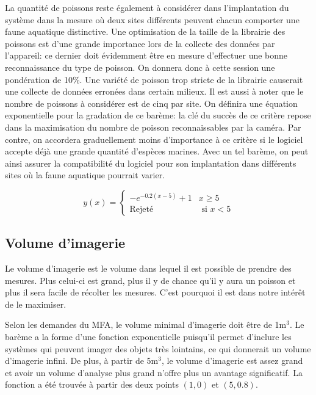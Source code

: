 La quantité de poissons reste également à considérer dans l'implantation du système dans la mesure où deux sites différents peuvent chacun comporter une faune aquatique distinctive. Une optimisation de la taille de la librairie des poissons est d'une grande importance lors de la collecte des données par l'appareil: ce dernier doit évidemment être en mesure d'effectuer une bonne reconnaissance du type de poisson. On donnera donc à cette session une pondération de 10\%. Une variété de poisson trop stricte de la librairie causerait une collecte de données erronées dans certain milieux. Il est aussi à noter que le nombre de poissons à considérer est de cinq par site. On définira une équation exponentielle pour la gradation de ce barème: la clé du succès de ce critère repose dans la maximisation du nombre de poisson reconnaissables par la caméra. Par contre, on accordera graduellement moins d'importance à ce critère si le logiciel accepte déjà une grande quantité d'espèces marines. Avec un tel barème, on peut ainsi assurer la compatibilité du logiciel pour son implantation dans différents sites où la faune aquatique pourrait varier.

\begin{equation}
    y(x) = \begin{cases}
        -e^{-0.2(x-5)} + 1 & x \geq 5 \\
        \text{Rejeté} & \text{ si } x < 5 
    \end{cases}
    \label{eq:bareme_identification}
\end{equation}

\subsection{Volume d'imagerie}

Le volume d'imagerie est le volume dans lequel il est possible de prendre des mesures. Plus celui-ci est grand, plus il y de chance qu'il y aura un poisson et plus il sera facile de récolter les mesures. C'est pourquoi il est dans notre intérêt de le maximiser.

Selon les demandes du MFA, le volume minimal d'imagerie doit être de 1m$^3$. Le barème a la forme d'une fonction exponentielle puisqu'il permet d'inclure les systèmes  qui peuvent imager des objets très lointains, ce qui donnerait un volume d'imagerie infini. De plus, à partir de 5m$^3$, le volume d'imagerie est assez grand et avoir un volume d'analyse plus grand n'offre plus un avantage significatif. La fonction a été trouvée à partir des deux points $(1, 0)$ et $(5, 0.8)$.

